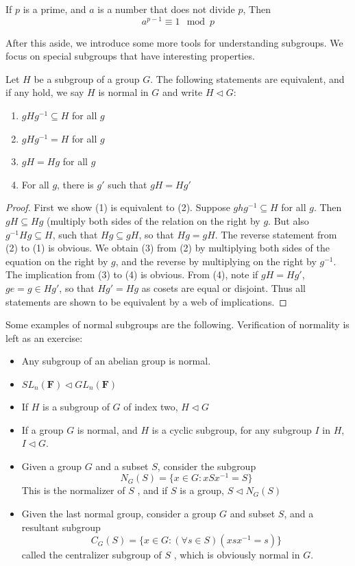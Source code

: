 \begin{corollary} 
    If $p$ is a prime, and $a$ is a number that does not divide $p$, Then
    \[ a^{p-1} \equiv 1 \mod{p} \]
\end{corollary}

After this aside, we introduce some more tools for understanding subgroups. We focus on special subgroups that have interesting properties.

\begin{theorem}
Let $H$ be a subgroup of a group $G$. The following statements are equivalent, and if any hold, we say $H$ is normal in $G$  and write $H \lhd G$:
\begin{enumerate}
    \item $gHg^{-1} \subseteq H$ for all $g$
    \item $gHg^{-1} = H$ for all $g$
    \item $gH = Hg$ for all $g$
    \item For all $g$, there is $g'$ such that $gH = Hg'$
\end{enumerate}
\end{theorem}
\begin{proof}
    First we show (1) is equivalent to (2). Suppose $ghg^{-1} \subseteq H$ for all $g$. Then $gH \subseteq Hg$ (multiply both sides of the relation on the right by $g$. But also $g^{-1}Hg \subseteq H$, such that $Hg \subseteq gH$, so that $Hg = gH$. The reverse statement from (2) to (1) is obvious. We obtain (3) from (2) by multiplying both sides of the equation on the right by $g$, and the reverse by multiplying on the right by $g^{-1}$. The implication from (3) to (4) is obvious. From (4), note if $gH = Hg'$, $ge = g \in Hg'$, so that $Hg' = Hg$ as cosets are equal or disjoint. Thus all statements are shown to be equivalent by a web of implications.
\end{proof}

Some examples of normal subgroups are the following. Verification of normality is left as an exercise:
\begin{itemize}
    \item Any subgroup of an abelian group is normal.
    \item $SL_n(\mathbf{F}) \lhd GL_n(\mathbf{F})$
    \item If $H$ is a subgroup of $G$ of index two, $H \lhd G$
    \item If a group $G$ is normal, and $H$ is a cyclic subgroup, for any subgroup $I$ in $H$, $I \lhd G$.
    \item Given a group $G$ and a subset $S$, consider the subgroup
    \[ N_G(S) = \{ x \in G : xSx^{-1} = S \} \]
    This is the normalizer of $S$ , and if $S$ is a group, $S \lhd N_G(S)$
    \item Given the last normal group, consider a group $G$ and subset $S$, and a resultant subgroup
    \[ C_G(S) = \{ x \in G : (\forall s \in S)(xsx^{-1} = s) \} \]
    called the centralizer subgroup of $S$ , which is obviously normal in $G$.
\end{itemize}

